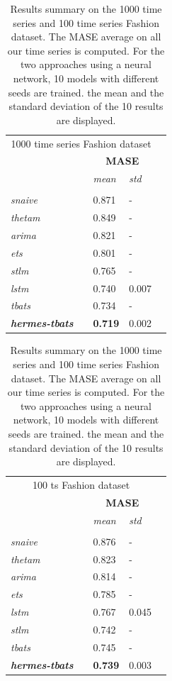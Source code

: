 \documentclass[review]{elsarticle}
\begin{document}
\begin{table}
  \caption{Results summary on the 1000 time series and 100 time series Fashion dataset. The MASE average on all our time series is computed. For the two approaches using a neural network, 10 models with different seeds are trained. the mean and the standard deviation of the 10 results are displayed.}
  \centering
  \begin{tabular}{l||llll}
    \multicolumn{4}{c}{1000 time series Fashion dataset}\vspace{0.5cm} \\
    &&\multicolumn{2}{c}{\textbf{MASE}} \\
    &&  \textit{mean}  & \textit{std}  \\
	 \hline
	 &&& \\
     \textit{snaive} && 0.871 & - \\
     \textit{thetam}  && 0.849 & - \\
     \textit{arima} && 0.821 & - \\
     \textit{ets} && 0.801 & - \\
     \textit{stlm} && 0.765 & - \\
     \textit{lstm} && 0.740 & 0.007 \\
     \textit{tbats} && 0.734 & - \\
     \textbf{\textit{hermes-tbats}} && \textbf{0.719} & 0.002 \\
  \end{tabular}

\vspace{.2cm}

  \begin{tabular}{l||llll}
   \multicolumn{4}{c}{100 ts Fashion dataset}\vspace{0.5cm} \\
   &&\multicolumn{2}{c}{\textbf{MASE}} \\
    &&  \textit{mean}  & \textit{std}  \\
	\hline
	 &&& \\
     \textit{snaive} && 0.876 & - \\
     \textit{thetam}  && 0.823 & - \\
     \textit{arima} && 0.814 & - \\
     \textit{ets} && 0.785 & - \\
     \textit{lstm} && 0.767 & 0.045 \\
     \textit{stlm} && 0.742 & - \\
     \textit{tbats} && 0.745 & - \\
     \textbf{\textit{hermes-tbats}} && \textbf{0.739} & 0.003 \\
  \end{tabular}
\label{tab:1000metricresults}
\end{table}
\end{document}
